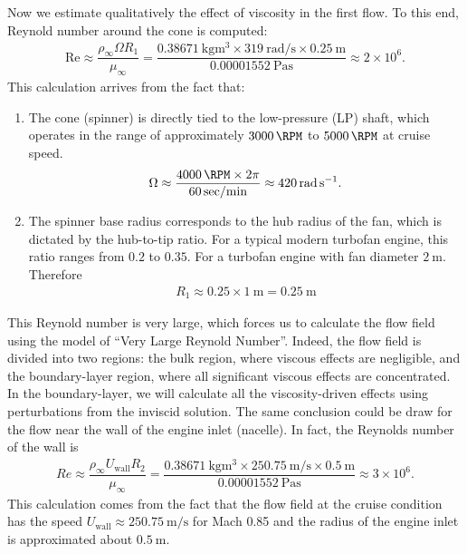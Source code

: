 \documentclass[12pt]{book}
\theoremstyle{bfnote}
\theoremstyle{bfnote}
\begin{document}
Now we estimate qualitatively the effect of viscosity in the first flow. To this end, Reynold number around the cone is computed:
\begin{align}
    \mathrm{Re} \approx \dfrac{\rho_{\infty} \Omega R_1}{\mu_{\infty}} = \dfrac{\SI{0.38671}{\kilogram\cubic\meter} \times \SI{319}{\radian\per\second} \times \SI{0.25}{\meter}}{\SI{0.00001552}{\pascal\second}} \approx 2 \times 10^6.
\end{align}
This calculation arrives from the fact that:
\begin{enumerate}
    \item The cone (spinner) is directly tied to the low-pressure (LP) shaft, which operates in the range of approximately $\SI{3000}{\RPM}$ to $\SI{5000}{\RPM}$ at cruise speed.
    \begin{align*}
        \Omega \approx \dfrac{\SI{4000}{\RPM} \times 2 \pi}{\SI{60}{\sec\per\min}} \approx \SI{420}{\radian\per\second}.
    \end{align*}
    \item The spinner base radius corresponds to the hub radius of the fan, which is dictated by the hub-to-tip ratio. For a typical modern turbofan engine, this ratio ranges from $0.2$ to $0.35$. For a turbofan engine with fan diameter $\SI{2}{\meter}$. Therefore
    \begin{align*}
        R_1 \approx 0.25 \times \SI{1}{\meter} = \SI{0.25}{\meter}
    \end{align*}
\end{enumerate}

This Reynold number is very large, which forces us to calculate the flow field using the model of \enquote{Very Large Reynold Number}. Indeed, the flow field is divided into two regions: the bulk region, where viscous effects are negligible, and the boundary-layer region, where all significant viscous effects are concentrated. In the boundary-layer, we will calculate all the viscosity-driven effects using perturbations from the inviscid solution. The same conclusion could be draw for the flow near the wall of the engine inlet (nacelle). In fact, the Reynolds number of the wall is
\begin{align*}
    Re \approx \dfrac{\rho_\infty U_{\text{wall}} R_2}{\mu_\infty} = \dfrac{\SI{0.38671}{\kilogram\cubic\meter} \times \SI{250.75}{\meter\per\second} \times \SI{0.5}{\meter}}{\SI{0.00001552}{\pascal\second}} \approx 3 \times 10^6.
\end{align*}
This calculation comes from the fact that the flow field at the cruise condition has the speed $U_{\text{wall}} \approx \SI{250.75}{\meter\per\second}$ for Mach 0.85 and the radius of the engine inlet is approximated about $\SI{0.5}{\meter}$.
\end{document}
